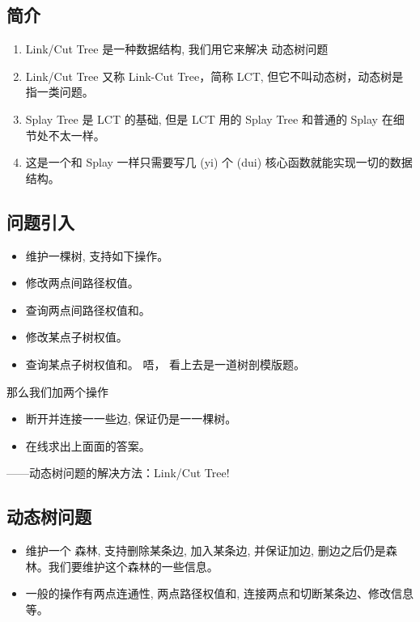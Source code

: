 
\subsection{简介}

\begin{enumerate}
\item Link/Cut Tree 是一种数据结构, 我们用它来解决 动态树问题
\item Link/Cut Tree 又称 Link-Cut Tree，简称 LCT, 但它不叫动态树，动态树是指一类问题。
\item Splay Tree 是 LCT 的基础, 但是 LCT ⽤的 Splay Tree 和普通的 Splay 在细节处不太一样。
\item 这是⼀个和 Splay ⼀样只需要写⼏ (yi) 个 (dui) 核心函数就能实现一切的数据结构。
\end{enumerate}

\subsection{问题引入}

\begin{itemize}
\item 维护一棵树, 支持如下操作。
\item 修改两点间路径权值。
\item 查询两点间路径权值和。
\item 修改某点子树权值。
\item 查询某点子树权值和。
  唔， 看上去是一道树剖模版题。
\end{itemize}

那么我们加两个操作

\begin{itemize}
\item 断开并连接⼀一些边, 保证仍是⼀一棵树。
\item 在线求出上⾯面的答案。
\end{itemize}

——动态树问题的解决方法：Link/Cut Tree!

\subsection{动态树问题}

\begin{itemize}
\item 维护一个 森林, 支持删除某条边, 加⼊某条边, 并保证加边, 删边之后仍是森林。我们要维护这个森林的一些信息。
\item 一般的操作有两点连通性, 两点路径权值和, 连接两点和切断某条边、修改信息等。
\end{itemize}

